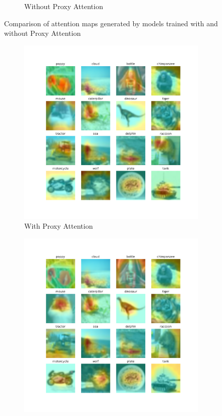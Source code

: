 \begin{figure}[h]
\begin{subfigure}[b]{.7\textwidth}
        \caption{Without Proxy Attention}
        \label{fig:noproxy}
    \end{subfigure}
    \caption{Comparison of attention maps generated by models trained with and without Proxy Attention}
    \label{fig:attention}
\end{figure}

\begin{figure}[h]
    \centering
    \begin{subfigure}[b]{0.7\textwidth}
        \includegraphics[width=\textwidth]{images/proxy_1.pdf}
        \caption{With Proxy Attention}
        \label{fig:proxy2}
    \end{subfigure}
    \hfill
    \begin{subfigure}[b]{.7\textwidth}
        \includegraphics[width=\textwidth]{images/noproxy_1.pdf}

\end{subfigure}
\end{figure}

